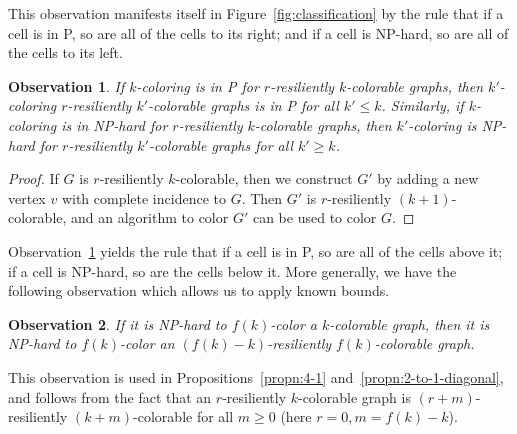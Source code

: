 \documentclass{llncs}
\newtheorem{obs}{Observation}
\begin{document}
This observation manifests itself in Figure~\ref{fig:classification} by the rule
that if a cell is in P, so are all of the cells to its right; and if a
cell is NP-hard, so are all of the cells to its left. 

\begin{obs}\label{obs:vertical}
If $k$-coloring is in P for $r$-resiliently $k$-colorable graphs, then
$k'$-coloring $r$-resiliently $k'$-colorable graphs is in P for all $k' \leq
k$. Similarly, if $k$-coloring is in NP-hard for $r$-resiliently $k$-colorable
graphs, then $k'$-coloring is NP-hard for $r$-resiliently $k'$-colorable graphs
for all $k' \geq k$.
\end{obs}
\begin{proof}
If $G$ is $r$-resiliently $k$-colorable, then we construct $G'$ by adding a
new vertex $v$ with complete incidence to $G$. Then $G'$ is $r$-resiliently
$(k+1)$-colorable, and an algorithm to color $G'$ can be used to color $G$.
\end{proof}

Observation~\ref{obs:vertical} yields the rule that if a cell is in P, so are
all of the cells above it; if a cell is NP-hard, so are the cells below it.
More generally, we have the following observation which allows us to apply
known bounds.

\begin{obs}\label{obs:function-bound}
If it is NP-hard to $f(k)$-color a $k$-colorable graph, then it is NP-hard to
$f(k)$-color an $(f(k)-k)$-resiliently $f(k)$-colorable graph.
\end{obs}

This observation is used in Propositions~\ref{propn:4-1}
and~\ref{propn:2-to-1-diagonal}, and follows from the fact that an
$r$-resiliently $k$-colorable graph is $(r+m)$-resiliently $(k+m)$-colorable
for all $m \geq 0$ (here $r = 0, m = f(k) - k$). 
\end{document}
